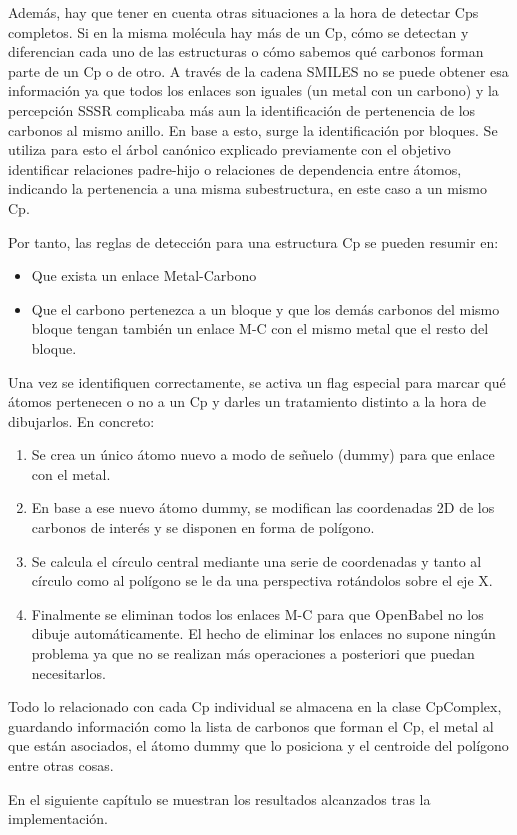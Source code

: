 Además, hay que tener en cuenta otras situaciones a la hora de detectar Cps completos. Si en la misma molécula hay más de un Cp, cómo se detectan y diferencian cada uno de las estructuras o cómo sabemos qué carbonos forman parte de un Cp o de otro. A través de la cadena SMILES no se puede obtener esa información ya que todos los enlaces son iguales (un metal con un carbono) y la percepción SSSR complicaba más aun la identificación de pertenencia de los carbonos al mismo anillo. En base a esto, surge la identificación por bloques. Se utiliza para esto el árbol canónico explicado previamente con el objetivo identificar relaciones padre-hijo o relaciones de dependencia entre átomos, indicando la pertenencia a una misma subestructura, en este caso a un mismo Cp.

Por tanto, las reglas de detección para una estructura Cp se pueden resumir en:
\begin{itemize}
    \item Que exista un enlace Metal-Carbono
    \item Que el carbono pertenezca a un bloque y que los demás carbonos del mismo bloque tengan también un enlace M-C con el mismo metal que el resto del bloque.
\end{itemize}

Una vez se identifiquen correctamente, se activa un flag especial para marcar qué átomos pertenecen o no a un Cp y darles un tratamiento distinto a la hora de dibujarlos. En concreto:  
\begin{enumerate}
    \item Se crea un único átomo nuevo a modo de señuelo (dummy) para que enlace con el metal.
    \item En base a ese nuevo átomo dummy, se modifican las coordenadas 2D de los carbonos de interés y se disponen en forma de polígono.
    \item Se calcula el círculo central mediante una serie de coordenadas y tanto al círculo como al polígono se le da una perspectiva rotándolos sobre el eje X.
    \item Finalmente se eliminan todos los enlaces M-C para que OpenBabel no los dibuje automáticamente. El hecho de eliminar los enlaces no supone ningún problema ya que no se realizan más operaciones a posteriori que puedan necesitarlos.
\end{enumerate} 

Todo lo relacionado con cada Cp individual se almacena en la clase CpComplex, guardando información como la lista de carbonos que forman el Cp, el metal al que están asociados, el átomo dummy que lo posiciona y el centroide del polígono entre otras cosas.

En el siguiente capítulo se muestran los resultados alcanzados tras la implementación.













